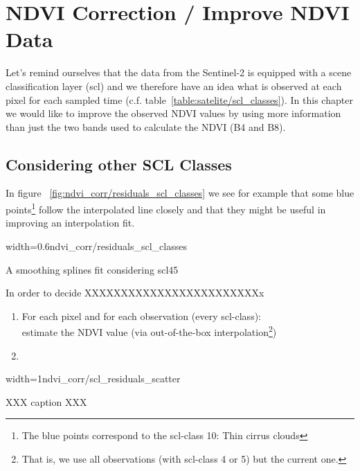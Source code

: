 \chapter{NDVI Correction / Improve NDVI Data}

Let's remind ourselves that the data from the Sentinel-2 is equipped with a scene classification layer (scl) and we therefore have an idea what is observed at each pixel for each sampled time (c.f. table~\ref{table:satelite/scl_classes}). In this chapter we would like to improve the observed NDVI values by using more information than just the two bands used to calculate the NDVI (B4 and B8).

\section{Considering other SCL Classes}
In figure ~\ref{fig:ndvi_corr/residuals_scl_classes} we see for example that some blue points\footnote{The blue points correspond to the scl-class 10: Thin cirrus clouds} follow the interpolated line closely and that they might be useful in improving an interpolation fit.
\begin{my_figure}[ht]{width=0.6\textwidth}{ndvi_corr/residuals_scl_classes}
    \caption{A smoothing splines fit considering scl45}
    \label{fig:ndvi_corr/residuals_scl_classes}
\end{my_figure}

In order to decide XXXXXXXXXXXXXXXXXXXXXXXXx



\begin{enumerate}
    \item For each pixel and for each observation (every scl-class):\\
          estimate the NDVI value (via out-of-the-box interpolation\footnote{That is, we use all observations (with scl-class 4 or 5) but the current one.})
    \item
\end{enumerate}







\begin{my_figure}[h]{width=1\textwidth}{ndvi_corr/scl_residuals_scatter}
    \caption{XXX caption XXX}
    \label{fig:ndvi_corr/scl_residuals_scatter}
\end{my_figure}
